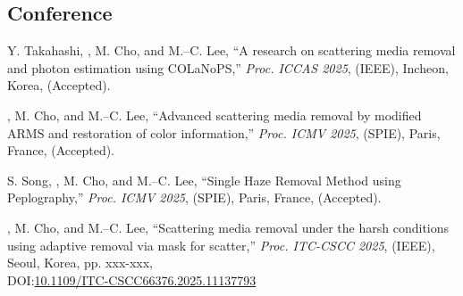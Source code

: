 \documentclass[a4paper,9pt]{extarticle}
\begin{document}
\subsection*{Conference}
\begin{enumerate}[label={[\arabic*]}, start=1]
    
    \item 
    Y. Takahashi, , M. Cho, and M.--C. Lee, 
    ``A research on scattering media removal and photon estimation using COLaNoPS,''
    \textit{Proc. ICCAS 2025}, (IEEE),
    Incheon, Korea,
    (Accepted).

    \item 
    , M. Cho, and M.--C. Lee, 
    ``Advanced scattering media removal by modified ARMS and restoration of color information,'' 
    \textit{Proc. ICMV 2025}, (SPIE),
    Paris, France,
    (Accepted).
        
    \item 
    S. Song, , M. Cho, and M.--C. Lee, 
    ``Single Haze Removal Method using Peplography,'' 
    \textit{Proc. ICMV 2025}, (SPIE),
    Paris, France,
    (Accepted).

    \item 
    , M. Cho, and M.--C. Lee, 
    ``Scattering media removal under the harsh conditions using adaptive removal via mask for scatter,'' 
    \textit{Proc. ITC-CSCC 2025}, (IEEE),
    Seoul, Korea, 
    pp. xxx-xxx, \\
    DOI:\href{https://doi.org/10.1109/ITC-CSCC66376.2025.11137793}{10.1109/ITC-CSCC66376.2025.11137793}
    

\end{enumerate}
\end{document}
